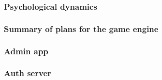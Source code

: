\subsubsection{Psychological dynamics}
\label{sec:future:impl:psycho}


\subsubsection{Summary of plans for the game engine}
\label{sec:future:impl:engineSummary}


\subsubsection{Admin app}
\label{sec:future:impl:adminApp}


\subsubsection{Auth server}
\label{sec:future:impl:authServer}

